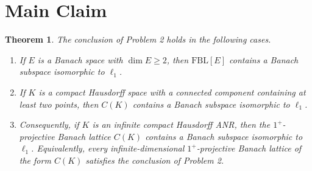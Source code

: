 \documentclass[11pt]{article}
\newtheorem{theorem}{Theorem}
\newcommand{\FBL}{\mathrm{FBL}}
\newcommand{\ellone}{\ell_1}
\begin{document}
\section*{Main Claim}

\begin{theorem}
\label{thm:families}
The conclusion of Problem 2 holds in the following cases.
\begin{enumerate}
\item If \(E\) is a Banach space with \(\dim E\ge 2\), then \(\FBL[E]\)
contains a Banach subspace isomorphic to \(\ellone\).
\item If \(K\) is a compact Hausdorff space with a connected component
containing at least two points, then \(C(K)\) contains a Banach subspace
isomorphic to \(\ellone\).
\item Consequently, if \(K\) is an infinite compact Hausdorff ANR, then
the \(1^+\)-projective Banach lattice \(C(K)\) contains a Banach subspace
isomorphic to \(\ellone\). Equivalently, every infinite-dimensional
\(1^+\)-projective Banach lattice of the form \(C(K)\) satisfies the
conclusion of Problem 2.
\end{enumerate}
\end{theorem}
\end{document}
